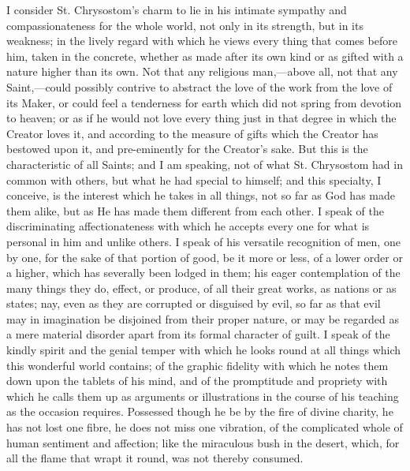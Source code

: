 I consider St. Chrysostom's charm to lie in his intimate sympathy
and compassionateness for the whole world, not only in its strength,
but in its weakness; in the lively regard with which he views every
thing that comes before him, taken in the concrete, whether as made
after its own kind or as gifted with a nature higher than its own. Not that any religious man,—above all, not that any Saint,—could
possibly contrive to abstract the love of the work from the love of
its Maker, or could feel a tenderness for earth which did not spring
from devotion to heaven; or as if he would not love every thing just
in that degree in which the Creator loves it, and according to the
measure of gifts which the Creator has bestowed upon it, and
pre-eminently for the Creator's sake. But this is the characteristic
of all Saints; and I am speaking, not of what St. Chrysostom had in
common with others, but what he had special to himself; and this
specialty, I conceive, is the interest which he takes in all things,
not so far as God has made them alike, but as He has made them
different from each other. I speak of the discriminating
affectionateness with which he accepts every one for what is personal
in him and unlike others. I speak of his versatile recognition of men,
one by one, for the sake of that portion of good, be it more or less,
of a lower order or a higher, which has severally been lodged in them;
his eager contemplation of the many things they do, effect, or
produce, of all their great works, as nations or as states; nay, even
as they are corrupted or disguised by evil, so far as that evil may in
imagination be disjoined from their proper nature, or may be regarded
as a mere material disorder apart from its formal character of guilt.
I speak of the kindly spirit and the genial temper with which he looks
round at all things which this wonderful world contains; of the
graphic fidelity with which he notes them down upon the tablets of his
mind, and of the promptitude and propriety with which he calls them up
as arguments or illustrations in the course of his teaching as the
occasion requires. Possessed though he be by the fire of divine
charity, he has not lost one fibre, he does not miss one
vibration, of the complicated whole of human sentiment and affection;
like the miraculous bush in the desert, which, for all the flame that
wrapt it round, was not thereby consumed.


